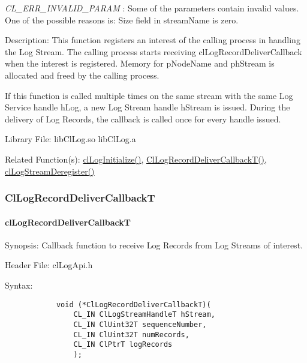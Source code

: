 \begin{flushleft}
\begin{Desc}
\item[{\em CL\_\-ERR\_\-INVALID\_\-PARAM}]: Some of the parameters contain invalid values. One of the possible reasons is:
Size field in streamName is zero.
\end{Desc}
\begin{Desc}
\item[Description:] This function registers an interest of the calling process in handling the Log Stream. The 
calling process starts receiving clLogRecordDeliverCallback when the interest is registered. Memory for pNodeName 
and phStream is allocated and freed by the calling process.
\par
If this function is called multiple times on the same stream with the same Log Service handle hLog, a new Log Stream handle hStream 
is issued. During the delivery of Log Records, the callback is called once for every handle issued.
\end{Desc}
\begin{Desc}
\item[Library File:] libClLog.so
\newline
libClLog.a
\end{Desc}
\begin{Desc}
\item[Related Function(s):]\hyperlink{pagelog101}{clLogInitialize()}, \hyperlink{pagelog113}{ClLogRecordDeliverCallbackT()},
\hyperlink{pagelog115}{clLogStreamDeregister()}
\end{Desc}
\newpage



\subsubsection{ClLogRecordDeliverCallbackT}
\hypertarget{pagelog113}{}\paragraph{cl\-Log\-Record\-Deliver\-CallbackT}\label{pagelog113}
\begin{Desc}
\item[Synopsis:] Callback function to receive Log Records from Log Streams of interest.\end{Desc}
\begin{Desc}
\item[Header File:] clLogApi.h \end{Desc}
\begin{Desc}
\item[Syntax:]
\footnotesize\begin{verbatim}        	
			void (*ClLogRecordDeliverCallbackT)(
				CL_IN ClLogStreamHandleT hStream,
				CL_IN ClUint32T sequenceNumber,
				CL_IN ClUint32T numRecords,
				CL_IN ClPtrT logRecords
				);


\end{verbatim}
\end{Desc}
\end{flushleft}
